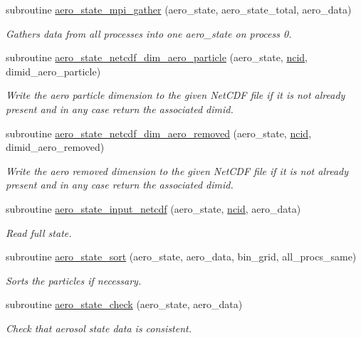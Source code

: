 \begin{DoxyCompactItemize}
subroutine \mbox{\hyperlink{namespacepmc__aero__state_ac8b1291fc517ab1d3ffe9642ab577c6c}{aero\+\_\+state\+\_\+mpi\+\_\+gather}} (aero\+\_\+state, aero\+\_\+state\+\_\+total, aero\+\_\+data)
\begin{DoxyCompactList}\small\item\em Gathers data from all processes into one aero\+\_\+state on process 0. \end{DoxyCompactList}\item 
subroutine \mbox{\hyperlink{namespacepmc__aero__state_acb748f0c0c6c37180e896af05acb1c19}{aero\+\_\+state\+\_\+netcdf\+\_\+dim\+\_\+aero\+\_\+particle}} (aero\+\_\+state, \mbox{\hyperlink{fractal_8_f90_a4e89f3f850921ff84a6dfce8b166ad50}{ncid}}, dimid\+\_\+aero\+\_\+particle)
\begin{DoxyCompactList}\small\item\em Write the aero particle dimension to the given Net\+C\+DF file if it is not already present and in any case return the associated dimid. \end{DoxyCompactList}\item 
subroutine \mbox{\hyperlink{namespacepmc__aero__state_a7d32f436e51ba2ff96838b47e2169585}{aero\+\_\+state\+\_\+netcdf\+\_\+dim\+\_\+aero\+\_\+removed}} (aero\+\_\+state, \mbox{\hyperlink{fractal_8_f90_a4e89f3f850921ff84a6dfce8b166ad50}{ncid}}, dimid\+\_\+aero\+\_\+removed)
\begin{DoxyCompactList}\small\item\em Write the aero removed dimension to the given Net\+C\+DF file if it is not already present and in any case return the associated dimid. \end{DoxyCompactList}\item 
subroutine \mbox{\hyperlink{namespacepmc__aero__state_a2118eb683c0dc350e8f48a59ea8ed8ce}{aero\+\_\+state\+\_\+input\+\_\+netcdf}} (aero\+\_\+state, \mbox{\hyperlink{fractal_8_f90_a4e89f3f850921ff84a6dfce8b166ad50}{ncid}}, aero\+\_\+data)
\begin{DoxyCompactList}\small\item\em Read full state. \end{DoxyCompactList}\item 
subroutine \mbox{\hyperlink{namespacepmc__aero__state_a6626b0ca62809bfeb3137aba559963d1}{aero\+\_\+state\+\_\+sort}} (aero\+\_\+state, aero\+\_\+data, bin\+\_\+grid, all\+\_\+procs\+\_\+same)
\begin{DoxyCompactList}\small\item\em Sorts the particles if necessary. \end{DoxyCompactList}\item 
subroutine \mbox{\hyperlink{namespacepmc__aero__state_a9ce29f42aed338fe38218ecc4bbfa158}{aero\+\_\+state\+\_\+check}} (aero\+\_\+state, aero\+\_\+data)
\begin{DoxyCompactList}\small\item\em Check that aerosol state data is consistent. \end{DoxyCompactList}\end{DoxyCompactItemize}
